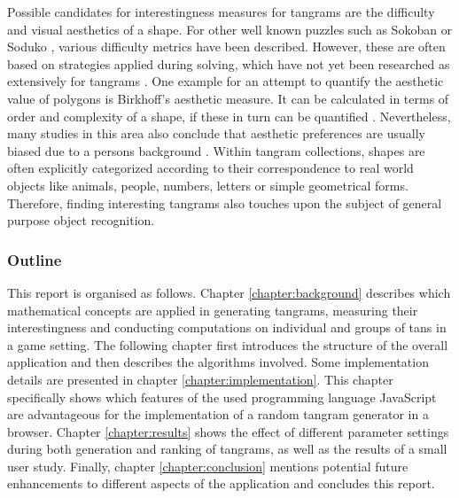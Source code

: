 Possible candidates for interestingness measures for tangrams are the difficulty and visual aesthetics of a shape. For other well known puzzles such as Sokoban \cite{jaruvsek10} or Soduko \cite{hunt07}, various difficulty metrics have been described. However, these are often based on strategies applied during solving, which have not yet been researched as extensively for tangrams \cite{baran07}. One example for an attempt to quantify the aesthetic value of polygons is Birkhoff's aesthetic measure. It can be calculated in terms of order and complexity of a shape, if these in turn can be quantified \cite{filonik09}. Nevertheless, many studies in this area also conclude that aesthetic preferences are usually biased due to a persons background \cite{eberle14}. Within tangram collections, shapes are often explicitly categorized according to their correspondence to real world objects like animals, people, numbers, letters or simple geometrical forms. Therefore, finding interesting tangrams also touches upon the subject of general purpose object recognition. 

\subsubsection*{Outline}

This report is organised as follows. Chapter \ref{chapter:background} describes which mathematical concepts are applied in generating tangrams, measuring their interestingness and conducting computations on individual and groups of tans in a game setting. The following chapter first introduces the structure of the overall application and then describes the algorithms involved. Some implementation details are presented in chapter \ref{chapter:implementation}. This chapter specifically shows which features of the used programming language JavaScript are advantageous for the implementation of a random tangram generator in a browser. Chapter \ref{chapter:results} shows the effect of different parameter settings during both generation and ranking of tangrams, as well as the results of a small user study. Finally, chapter \ref{chapter:conclusion} mentions potential future enhancements to different aspects of the application and concludes this report.
